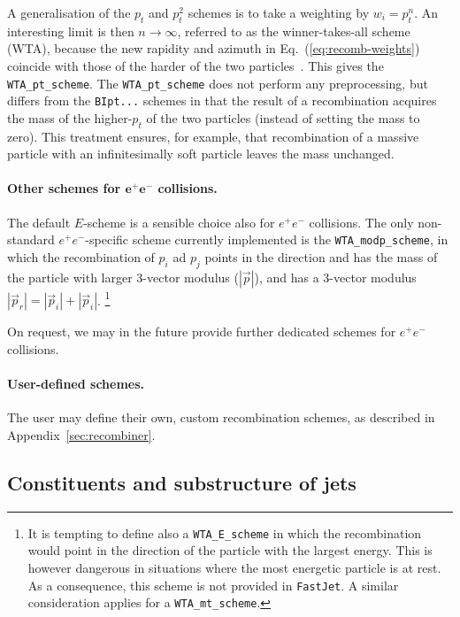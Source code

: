 \documentclass[12pt,a4]{article}
\newcommand{\fastjet}{\texttt{FastJet}\xspace}
\newcommand{\ttt}[1]{{\small\texttt{#1}}}
\newcommand{\ee}{e^+e^-}
\begin{document}
A generalisation of the $p_t$ and $p_t^2$ schemes is to take a
weighting by $w_i = p_t^n$. 
%
An interesting limit is then $n \to \infty$, referred to as the
winner-takes-all scheme (WTA), because the new rapidity and azimuth in
Eq.~(\ref{eq:recomb-weights}) coincide with those of the harder of the
two particles~\cite{Bertolini:2013iqa}. 
%
This gives the \ttt{WTA\_pt\_scheme}. 
%
The \ttt{WTA\_pt\_scheme} does not perform any preprocessing, but
differs from the \ttt{BIpt...} schemes in that the result of a
recombination acquires the mass of the higher-$p_t$ of the two
particles (instead of setting the mass to zero).
%
This treatment ensures, for example, that recombination of a massive
particle with an infinitesimally soft particle leaves the mass
unchanged.

\paragraph{Other schemes for $\boldsymbol{e^+e^-}$ collisions.}
%
The default $E$-scheme is a sensible choice also for $e^+e^-$
collisions.
%
The only non-standard $e^+e^-$-specific scheme currently implemented
is the \ttt{WTA\_modp\_scheme}, in which the recombination of $p_i$ ad
$p_j$ points in the direction and has the mass of the particle with
larger 3-vector modulus ($|\vec p|$), and has a 3-vector modulus
$|\vec p_r| = |\vec p_i| + |\vec p_i|$.
%
\footnote{It is tempting to define also a \ttt{WTA\_E\_scheme} in
  which the recombination would point in the direction of the particle
  with the largest energy. This is however dangerous in situations
  where the most energetic particle is at rest. As a consequence, this
  scheme is not provided in \fastjet. A similar consideration applies
  for a \ttt{WTA\_mt\_scheme}.}

%
On request, we may in the future provide further dedicated schemes for
$\ee$ collisions.

\paragraph{User-defined schemes.} The user may define their own,
custom recombination schemes, as described in Appendix~\ref{sec:recombiner}.





\subsection{Constituents and substructure of jets}
\label{sec:constituents}
\end{document}
